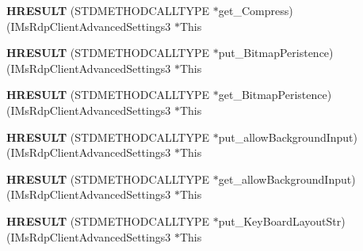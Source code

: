 \begin{DoxyCompactItemize}
\item 
\mbox{\label{struct_i_ms_rdp_client_advanced_settings3_vtbl_a48ab35da5a3583ce2af3f6c793c32394}} 
{\bfseries H\+R\+E\+S\+U\+LT} (S\+T\+D\+M\+E\+T\+H\+O\+D\+C\+A\+L\+L\+T\+Y\+PE $\ast$get\+\_\+\+Compress)(I\+Ms\+Rdp\+Client\+Advanced\+Settings3 $\ast$This
\item 
\mbox{\label{struct_i_ms_rdp_client_advanced_settings3_vtbl_ae8ae808d16723eac2eb6b5bb7a6012fa}} 
{\bfseries H\+R\+E\+S\+U\+LT} (S\+T\+D\+M\+E\+T\+H\+O\+D\+C\+A\+L\+L\+T\+Y\+PE $\ast$put\+\_\+\+Bitmap\+Peristence)(I\+Ms\+Rdp\+Client\+Advanced\+Settings3 $\ast$This
\item 
\mbox{\label{struct_i_ms_rdp_client_advanced_settings3_vtbl_a896e7b9b223aabf0fe80411e279c61c6}} 
{\bfseries H\+R\+E\+S\+U\+LT} (S\+T\+D\+M\+E\+T\+H\+O\+D\+C\+A\+L\+L\+T\+Y\+PE $\ast$get\+\_\+\+Bitmap\+Peristence)(I\+Ms\+Rdp\+Client\+Advanced\+Settings3 $\ast$This
\item 
\mbox{\label{struct_i_ms_rdp_client_advanced_settings3_vtbl_a69dd626115e144d5d35b9922a2d263cd}} 
{\bfseries H\+R\+E\+S\+U\+LT} (S\+T\+D\+M\+E\+T\+H\+O\+D\+C\+A\+L\+L\+T\+Y\+PE $\ast$put\+\_\+allow\+Background\+Input)(I\+Ms\+Rdp\+Client\+Advanced\+Settings3 $\ast$This
\item 
\mbox{\label{struct_i_ms_rdp_client_advanced_settings3_vtbl_a6b4aff68558c212c2a71485ca58f4d34}} 
{\bfseries H\+R\+E\+S\+U\+LT} (S\+T\+D\+M\+E\+T\+H\+O\+D\+C\+A\+L\+L\+T\+Y\+PE $\ast$get\+\_\+allow\+Background\+Input)(I\+Ms\+Rdp\+Client\+Advanced\+Settings3 $\ast$This
\item 
\mbox{\label{struct_i_ms_rdp_client_advanced_settings3_vtbl_a306342a688c1cd488a72a8cc01f9c263}} 
{\bfseries H\+R\+E\+S\+U\+LT} (S\+T\+D\+M\+E\+T\+H\+O\+D\+C\+A\+L\+L\+T\+Y\+PE $\ast$put\+\_\+\+Key\+Board\+Layout\+Str)(I\+Ms\+Rdp\+Client\+Advanced\+Settings3 $\ast$This
\item 
\mbox{\label{struct_i_ms_rdp_client_advanced_settings3_vtbl_a5a64ebed15e63a3a42022d78a0ad9b56}} 

\end{DoxyCompactItemize}
